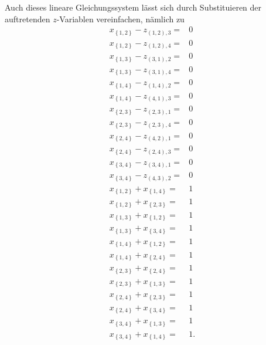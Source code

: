 \documentclass[10p,a4paper,BCOR = 12mm, DIV=15]{scrbook}
\begin{document}
{\begin{bew}
Auch dieses lineare Gleichungssystem lässt sich durch Substituieren der auftretenden $z$-Variablen vereinfachen, nämlich zu
{
\allowdisplaybreaks
\begin{align*}
x_{\left\{1, 2\right\}} - z_{\left(1, 2\right), 3} = & 0 \\
x_{\left\{1, 2\right\}} - z_{\left(1, 2\right), 4} = & 0 \\
x_{\left\{1, 3\right\}} - z_{\left(3, 1\right), 2} = & 0 \\
x_{\left\{1, 3\right\}} - z_{\left(3, 1\right), 4} = & 0 \\
x_{\left\{1, 4\right\}} - z_{\left(1, 4\right), 2} = & 0 \\
x_{\left\{1, 4\right\}} - z_{\left(4, 1\right), 3} = & 0 \\
x_{\left\{2, 3\right\}} - z_{\left(2, 3\right), 1} = & 0 \\
x_{\left\{2, 3\right\}} - z_{\left(2, 3\right), 4} = & 0 \\
x_{\left\{2, 4\right\}} - z_{\left(4, 2\right), 1} = & 0 \\
x_{\left\{2, 4\right\}} - z_{\left(2, 4\right), 3} = & 0 \\
x_{\left\{3, 4\right\}} - z_{\left(3, 4\right), 1} = & 0 \\
x_{\left\{3, 4\right\}} - z_{\left(4, 3\right), 2} = & 0 \\
x_{\left\{1, 2\right\}} + x_{\left\{1, 4\right\}} = & 1 \\
x_{\left\{1, 2\right\}} + x_{\left\{2, 3\right\}} = & 1 \\
x_{\left\{1, 3\right\}} + x_{\left\{1, 2\right\}} = & 1 \\
x_{\left\{1, 3\right\}} + x_{\left\{3, 4\right\}} = & 1 \\
x_{\left\{1, 4\right\}} + x_{\left\{1, 2\right\}} = & 1 \\
x_{\left\{1, 4\right\}} + x_{\left\{2, 4\right\}} = & 1 \\
x_{\left\{2, 3\right\}} + x_{\left\{2, 4\right\}} = & 1 \\
x_{\left\{2, 3\right\}} + x_{\left\{1, 3\right\}} = & 1 \\
x_{\left\{2, 4\right\}} + x_{\left\{2, 3\right\}} = & 1 \\
x_{\left\{2, 4\right\}} + x_{\left\{3, 4\right\}} = & 1 \\
x_{\left\{3, 4\right\}} + x_{\left\{1, 3\right\}} = & 1 \\
x_{\left\{3, 4\right\}} + x_{\left\{1, 4\right\}} = & 1.
\end{align*}
}


\end{bew}}
\end{document}
